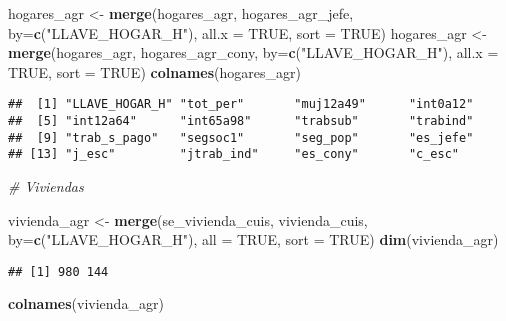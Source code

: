 \documentclass[11pt,]{article}
\newenvironment{Shaded}{\begin{snugshade}}{\end{snugshade}}
\newcommand{\KeywordTok}[1]{\textcolor[rgb]{0.13,0.29,0.53}{\textbf{#1}}}
\newcommand{\DataTypeTok}[1]{\textcolor[rgb]{0.13,0.29,0.53}{#1}}
\newcommand{\StringTok}[1]{\textcolor[rgb]{0.31,0.60,0.02}{#1}}
\newcommand{\CommentTok}[1]{\textcolor[rgb]{0.56,0.35,0.01}{\textit{#1}}}
\newcommand{\OtherTok}[1]{\textcolor[rgb]{0.56,0.35,0.01}{#1}}
\newcommand{\NormalTok}[1]{#1}
\begin{document}
\begin{Shaded}
\begin{Highlighting}[]
\NormalTok{hogares_agr <-}\StringTok{ }\KeywordTok{merge}\NormalTok{(hogares_agr,}
\NormalTok{                     hogares_agr_jefe,}
                     \DataTypeTok{by=}\KeywordTok{c}\NormalTok{(}\StringTok{"LLAVE_HOGAR_H"}\NormalTok{),}
                     \DataTypeTok{all.x =} \OtherTok{TRUE}\NormalTok{,}
                     \DataTypeTok{sort =} \OtherTok{TRUE}\NormalTok{)}
\NormalTok{hogares_agr <-}\StringTok{ }\KeywordTok{merge}\NormalTok{(hogares_agr,}
\NormalTok{                     hogares_agr_cony,}
                     \DataTypeTok{by=}\KeywordTok{c}\NormalTok{(}\StringTok{"LLAVE_HOGAR_H"}\NormalTok{),}
                     \DataTypeTok{all.x =} \OtherTok{TRUE}\NormalTok{,}
                     \DataTypeTok{sort =} \OtherTok{TRUE}\NormalTok{)}
\KeywordTok{colnames}\NormalTok{(hogares_agr)}
\end{Highlighting}
\end{Shaded}

\begin{verbatim}
##  [1] "LLAVE_HOGAR_H" "tot_per"       "muj12a49"      "int0a12"      
##  [5] "int12a64"      "int65a98"      "trabsub"       "trabind"      
##  [9] "trab_s_pago"   "segsoc1"       "seg_pop"       "es_jefe"      
## [13] "j_esc"         "jtrab_ind"     "es_cony"       "c_esc"
\end{verbatim}

\begin{Shaded}
\begin{Highlighting}[]
\CommentTok{# Viviendas}

\NormalTok{vivienda_agr <-}\StringTok{ }\KeywordTok{merge}\NormalTok{(se_vivienda_cuis,}
\NormalTok{                      vivienda_cuis,}
                      \DataTypeTok{by=}\KeywordTok{c}\NormalTok{(}\StringTok{"LLAVE_HOGAR_H"}\NormalTok{),}
                      \DataTypeTok{all =} \OtherTok{TRUE}\NormalTok{,}
                      \DataTypeTok{sort =} \OtherTok{TRUE}\NormalTok{)}
\KeywordTok{dim}\NormalTok{(vivienda_agr)}
\end{Highlighting}
\end{Shaded}

\begin{verbatim}
## [1] 980 144
\end{verbatim}

\begin{Shaded}
\begin{Highlighting}[]
\KeywordTok{colnames}\NormalTok{(vivienda_agr)}
\end{Highlighting}
\end{Shaded}
\end{document}
